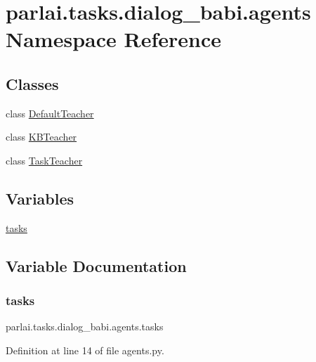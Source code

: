 \hypertarget{namespaceparlai_1_1tasks_1_1dialog__babi_1_1agents}{}\section{parlai.\+tasks.\+dialog\+\_\+babi.\+agents Namespace Reference}
\label{namespaceparlai_1_1tasks_1_1dialog__babi_1_1agents}
\subsection*{Classes}
\begin{DoxyCompactItemize}
\item 
class \hyperlink{classparlai_1_1tasks_1_1dialog__babi_1_1agents_1_1DefaultTeacher}{Default\+Teacher}
\item 
class \hyperlink{classparlai_1_1tasks_1_1dialog__babi_1_1agents_1_1KBTeacher}{K\+B\+Teacher}
\item 
class \hyperlink{classparlai_1_1tasks_1_1dialog__babi_1_1agents_1_1TaskTeacher}{Task\+Teacher}
\end{DoxyCompactItemize}
\subsection*{Variables}
\begin{DoxyCompactItemize}
\item 
\hyperlink{namespaceparlai_1_1tasks_1_1dialog__babi_1_1agents_a0a6403e709bade6ce9bfd9f6ff2455b6}{tasks}
\end{DoxyCompactItemize}


\subsection{Variable Documentation}
\mbox{\label{namespaceparlai_1_1tasks_1_1dialog__babi_1_1agents_a0a6403e709bade6ce9bfd9f6ff2455b6}} 
\subsubsection{\texorpdfstring{tasks}{tasks}}
{\footnotesize\ttfamily parlai.\+tasks.\+dialog\+\_\+babi.\+agents.\+tasks}



Definition at line 14 of file agents.\+py.

